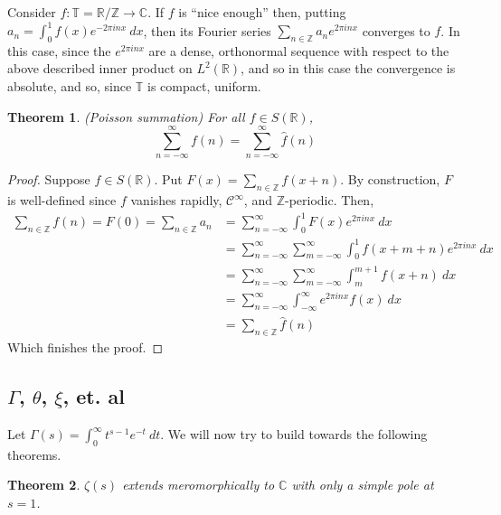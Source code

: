 \documentclass[12pt]{article}
\newcommand{\reals}{\mathbb{R}}
\newcommand{\ints}{\mathbb{Z}}
\newcommand{\complex}{\mathbb{C}}
\newcommand{\T}{\mathbb{T}}
\newtheorem{thm}{Theorem}
\numberwithin{equation}{section}
\numberwithin{thm}{section}
\numberwithin{lemma}{section}
\numberwithin{cor}{section}
\begin{document}
Consider $f: \T = \reals / \ints \to \complex$. If $f$ is ``nice enough'' then, putting $a_n = \int_0^1 f(x)e^{-2\pi i n x} \ dx$, then its Fourier series $\sum_{n \in \ints} a_n e^{2 \pi i n x}$ converges to $f$. In this case, since the $e^{2 \pi i n x}$ are a dense, orthonormal sequence with respect to the above described inner product on $L^2(\reals)$, and so in this case the convergence is absolute, and so, since $\T$ is compact, uniform.

\begin{thm}\label{PoissonSummation}
  (Poisson summation) For all $f \in S(\reals)$, \begin{equation*}
    \sum_{n = - \infty}^{\infty} f(n) = \sum_{n = - \infty}^{\infty} \hat{f}(n)
  \end{equation*}
\end{thm}

\begin{proof}
  Suppose $f \in S(\reals)$. Put $F(x) = \sum_{n \in \ints} f(x + n)$. By construction, $F$ is well-defined since $f$ vanishes rapidly, $\mathcal{C}^{\infty}$, and $\ints$-periodic. Then, \begin{align*}
    \sum_{n \in \ints} f(n) = F(0) = \sum_{n \in \ints} a_n &= \sum_{n = -\infty}^{\infty} \int_0^1 F(x)e^{2 \pi i n x} \ dx \\
    &= \sum_{n = -\infty}^{\infty} \sum_{m = -\infty}^{\infty} \int_0^1 f(x + m + n) e^{2 \pi i n x} \ dx \\
    &= \sum_{n = -\infty}^{\infty} \sum_{m = -\infty}^{\infty} \int_m^{m+1} f(x + n) \ dx \\
    &= \sum_{n = -\infty}^{\infty} \int_{-\infty}^{\infty} e^{2 \pi i n x} f(x) \ dx \\
    &= \sum_{n \in \ints} \hat{f}(n)
  \end{align*} Which finishes the proof.
\end{proof}

\subsection{$\Gamma$, $\theta$, $\xi$, et. al}

Let $\Gamma(s) = \int_0^{\infty} t^{s-1} e^{-t} \ dt$. We will now try to build towards the following theorems.

\begin{thm}\label{ZetaIsMeromorphic}
  $\zeta(s)$ extends meromorphically to $\complex$ with only a simple pole at $s = 1$.
\end{thm}
\end{document}
